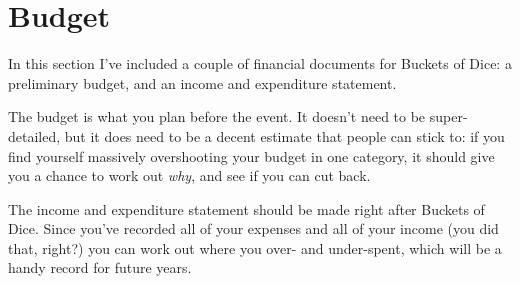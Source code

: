 \section{Budget}

In this section I've included a couple of financial documents for Buckets of Dice: a preliminary budget, and an income and expenditure statement.

The budget is what you plan before the event. It doesn't need to be super-detailed, but it does need to be a decent estimate that people can stick to: if you find yourself massively overshooting your budget in one category, it should give you a chance to work out \textit{why}, and see if you can cut back.

The income and expenditure statement should be made right after Buckets of Dice. Since you've recorded all of your expenses and all of your income (you did that, right?) you can work out where you over- and under-spent, which will be a handy record for future years.


